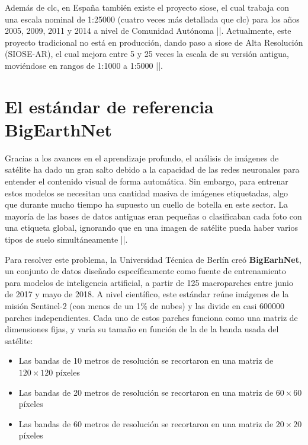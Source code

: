 Además de \acrshort{clc}, en España también existe el proyecto \acrfull{siose}, el cual trabaja con una escala nominal de 1:25000 (cuatro veces 
más detallada que \acrshort{clc}) para los años 2005, 2009, 2011 y 2014 a nivel de Comunidad Autónoma |\citet{sioseb}|. Actualmente, este proyecto tradicional no 
está en producción, dando paso a \acrshort{siose} de Alta Resolución (SIOSE-AR), el cual mejora entre 5 y 25 veces la escala de su versión 
antigua, moviéndose en rangos de 1:1000 a 1:5000 |\citet{siosear}|.

\section{El estándar de referencia BigEarthNet}
\label{bigearthnet}

Gracias a los avances en el aprendizaje profundo, el análisis de imágenes de satélite ha dado un gran salto debido a la capacidad de las
redes neuronales para entender el contenido visual de forma automática. Sin embargo, para entrenar estos modelos se necesitan una cantidad masiva
de imágenes etiquetadas, algo que durante mucho tiempo ha supuesto un cuello de botella en este sector. La mayoría de las bases de datos antiguas 
eran pequeñas o clasificaban cada foto con una etiqueta global, ignorando que en una imagen de satélite pueda haber varios tipos de suelo simultáneamente 
|\citet{bigearthnet}|.


Para resolver este problema, la Universidad Técnica de Berlín creó \textbf{BigEarhNet}, un conjunto de datos diseñado específicamente como fuente
de entrenamiento para modelos de inteligencia artificial, a partir de 125 macroparches entre junio de 2017 y mayo de 2018. A nivel científico, este 
estándar reúne imágenes de la misión Sentinel-2 (con menos de un 1\% de nubes) y las divide en casi 600000 parches independientes. Cada uno de 
estos parches funciona como una matriz de dimensiones fijas, 
y varía su tamaño en función de la de la banda usada del satélite: \begin{itemize}
    \item Las bandas de 10 metros de resolución se recortaron en una matriz de $120\times 120$ píxeles
    \item Las bandas de 20 metros de resolución se recortaron en una matriz de $60\times 60$ píxeles
    \item Las bandas de 60 metros de resolución se recortaron en una matriz de $20\times 20$ píxeles
\end{itemize}

